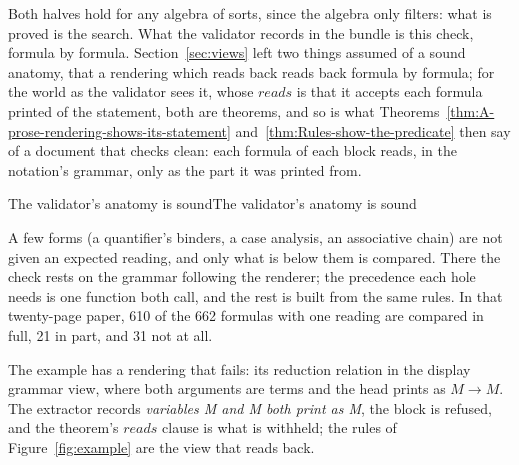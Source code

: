\documentclass[acmsmall,screen,review,anonymous,nonacm]{acmart}
\begin{document}
Both halves hold for any algebra of sorts, since the algebra only filters:
what is proved is the search. What the validator records in the bundle is
this check, formula by formula. Section~\ref{sec:views} left two things
assumed of a sound anatomy, that a rendering which reads back reads back
formula by formula; for the world as the validator sees it, whose
$\mathit{reads}$ is that it accepts each formula printed of the statement,
both are theorems, and so is what Theorems~\ref{thm:A-prose-rendering-shows-its-statement}
and~\ref{thm:Rules-show-the-predicate} then say of a document that checks
clean: each formula of each block reads, in the notation's grammar, only as
the part it was printed from.

\begin{leantheorem}[sum=bFehaYIcNf]{The validator's anatomy is sound}{The validator's anatomy is sound}
\label{thm:The-validator's-anatomy-is-sound}
\end{leantheorem}

A few forms (a quantifier's binders, a case analysis, an associative chain)
are not given an expected reading, and only what is below them is
compared. There the check rests on the grammar following the renderer; the precedence each hole needs is one function both call, and the rest is built from the same rules. In that twenty-page paper, 610 of the
662 formulas with one reading are compared in full, 21 in part, and 31 not
at all.

The example has a rendering that fails: its reduction relation in the
display grammar view, where both arguments are terms and the head prints as
$M \longrightarrow M$. The extractor records
\emph{variables M and M both print as M}, the block is refused, and the
theorem's $\mathit{reads}$ clause is what is withheld; the rules of
Figure~\ref{fig:example} are the view that reads back.
\end{document}
